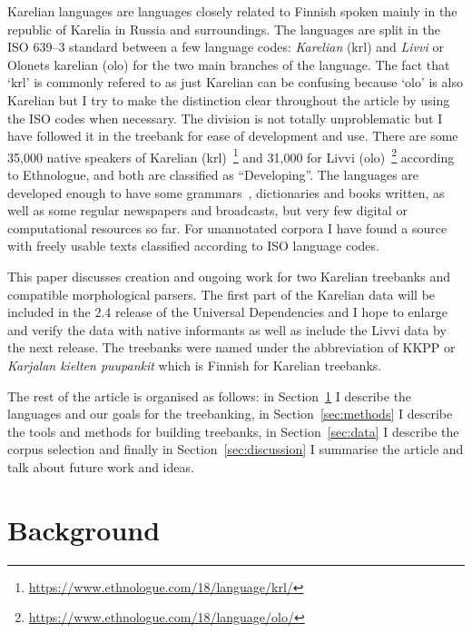 \documentclass{flammie}
\begin{document}
Karelian languages are languages closely related to Finnish spoken mainly in the
republic of Karelia in Russia and surroundings. The languages are split in the
ISO 639--3 standard between a few language codes: \textit{Karelian} (krl) and
\textit{Livvi} or Olonets karelian (olo) for the two main branches of the
language. The fact that `krl' is commonly refered to as just Karelian can be
confusing because `olo' is also Karelian but I try to make the distinction clear
throughout the article by using the ISO codes when necessary. The division is
not totally unproblematic but I have followed it in the treebank for ease of
development and use. There are some 35,000 native speakers of Karelian
(krl)~\footnote{\url{https://www.ethnologue.com/18/language/krl/}} and 31,000
for Livvi (olo)~\footnote{\url{https://www.ethnologue.com/18/language/olo/}}
according to Ethnologue, and both are classified as ``Developing''.  The
languages are developed enough to have some
grammars~\cite{zaikov2013vienankarjalan,ahtia1938karjalan,markianova2002karjalan},
dictionaries and books written, as well as some regular newspapers and
broadcasts, but very few digital or computational resources so far. For
unannotated corpora I have found a source with freely usable texts classified
according to ISO language codes.

This paper discusses creation and ongoing work for two Karelian treebanks and
compatible morphological parsers. The first part of the Karelian data will be
included in the 2.4 release of the Universal Dependencies and I hope to enlarge
and verify the data with native informants as well as include the Livvi data
by the next release. The treebanks were named under the abbreviation of KKPP or
\textit{Karjalan kielten puupankit} which is Finnish for Karelian treebanks.

The rest of the article is organised as follows: in Section~\ref{sec:background}
I describe the languages and our goals for the treebanking, in
Section~\ref{sec:methods} I describe the tools and methods for building
treebanks, in Section~\ref{sec:data} I describe the corpus selection and
finally in Section~\ref{sec:discussion} I summarise the article and talk about
future work and ideas.

\section{Background}
\label{sec:background}
\end{document}
